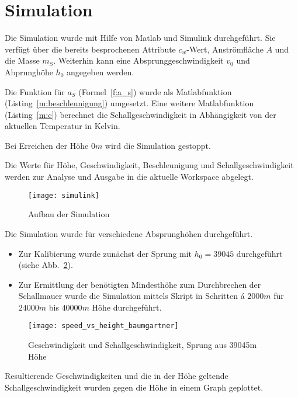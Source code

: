 \section{Simulation}\label{sec:simulation}

Die Simulation wurde mit Hilfe von Matlab und Simulink durchgeführt.
Sie verfügt über die bereits besprochenen Attribute $c_w$-Wert, Anströmfläche $A$ und die Masse $m_S$. Weiterhin kann eine Absprunggeschwindigkeit $v_0$ und Abprunghöhe $h_0$ angegeben werden.

Die Funktion für $a_S$ (Formel~\ref{f:a_s}) wurde als Matlabfunktion (Listing~\ref{m:beschleunigung}) umgesetzt.
Eine weitere Matlabfunktion (Listing~\ref{m:c}) berechnet die Schallgeschwindigkeit in Abhängigkeit von der aktuellen Temperatur in Kelvin.





Bei Erreichen der Höhe $0m$ wird die Simulation gestoppt.

Die Werte für Höhe, Geschwindigkeit, Beschleunigung und Schallgeschwindigkeit werden zur Analyse und Ausgabe in die aktuelle Workspace abgelegt.

\begin{figure}[h]
  \centering
  \texttt{[image: simulink]}
  \caption{Aufbau der Simulation}
  \label{fig:simulink}
\end{figure}

Die Simulation wurde für verschiedene Absprunghöhen durchgeführt.
\begin{itemize}
  \item Zur Kalibierung wurde zunächst der Sprung mit $h_0=39045$ durchgeführt (siehe Abb.~\ref{fig:39045}).
  \item Zur Ermittlung der benötigten Mindesthöhe zum Durchbrechen der Schallmauer wurde die Simulation mittels Skript in Schritten á $2000m$ für  $24000m$ bis $40000m$ Höhe durchgeführt.
\end{itemize}

\begin{figure}[h]
  \centering
  \texttt{[image: speed\_vs\_height\_baumgartner]}
  \caption{Geschwindigkeit und Schallgeschwindigkeit, Sprung aus 39045m Höhe}
  \label{fig:39045}
\end{figure}

Resultierende Geschwindigkeiten und die in der Höhe geltende Schallgeschwindigkeit wurden gegen die Höhe in einem Graph geplottet.

